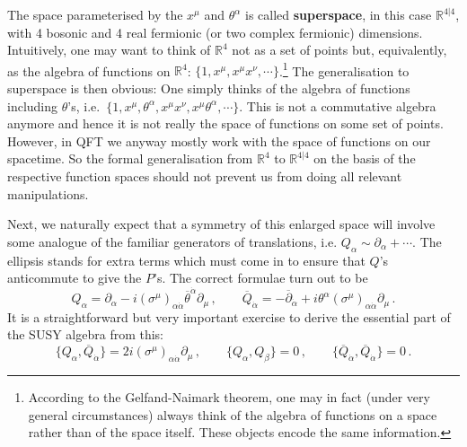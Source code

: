 \documentclass[12pt]{article}
\newcommand{\be}{\begin{equation}}
\newcommand{\ee}{\end{equation}}
\newcommand{\ol}{\overline}
\numberwithin{equation}{section}
\begin{document}
The space parameterised by the $x^\mu$ and $\theta^\alpha$ is called {\bf superspace}, in this case $\mathbb{R}^{4|4}$, with 4 bosonic and 4 real fermionic (or two complex fermionic) dimensions. Intuitively, one may want to think of $\mathbb{R}^4$ not as a set of points but, equivalently, as the algebra of functions on $\mathbb{R}^4$: $\{1,x^\mu,x^\mu x^\nu,\cdots\}$.\footnote{According to the Gelfand-Naimark theorem, one may in fact (under very general circumstances) always think of the algebra of functions on a space rather than of the space itself. These objects encode the same information.} The generalisation to superspace is then obvious: One simply thinks of the algebra of functions including $\theta$'s, i.e.~$\{1,x^\mu,\theta^\alpha,x^\mu x^\nu,x^\mu\theta^\alpha, \cdots\}$. This is not a commutative algebra anymore and hence it is not really the space of functions on some set of points. However, in QFT we anyway mostly work with the space of functions on our spacetime. So the formal generalisation from $\mathbb{R}^4$ to $\mathbb{R}^{4|4}$ on the basis of the respective function spaces should not prevent us from doing all relevant manipulations.

Next, we naturally expect that a symmetry of this enlarged space will involve some analogue of the familiar generators of translations, i.e. $Q_\alpha \sim
\partial_\alpha+\cdots$. The ellipsis stands for extra terms which must come in to ensure that $Q$'s anticommute to give the $P$'s. The correct formulae turn out to be
\be
Q_\alpha=\partial_\alpha-i(\sigma^\mu)_{\alpha\dot{\alpha}} \ol{\theta}^{\dot{\alpha}}\partial_\mu\,,\qquad 
\ol{Q}_{\dot{\alpha}}=-\ol{\partial}_{\dot{\alpha}}+i\theta^\alpha (\sigma^\mu)_{\alpha\dot{\alpha}} \partial_\mu\,.
\ee
It is a straightforward but very important exercise to derive the essential part of the SUSY algebra from this:
\be
\{Q_\alpha,\ol{Q}_{\dot{\alpha}}\}=2i(\sigma^\mu)_{\alpha\dot{\alpha}} \partial_\mu\,, \qquad \{Q_\alpha,Q_\beta\}=0\,,\qquad \{\ol{Q}_{\dot{\alpha}} ,\ol{Q}_{\dot{\alpha}}\}=0\,.\label{algd}
\ee
\end{document}
